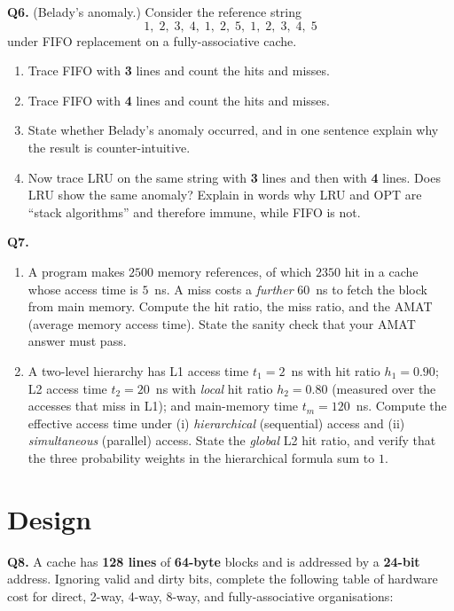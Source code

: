 \documentclass[11pt]{article}
\begin{document}
\textbf{Q6.} (Belady's anomaly.) Consider the reference string
\[
1,\;2,\;3,\;4,\;1,\;2,\;5,\;1,\;2,\;3,\;4,\;5
\]
under FIFO replacement on a fully-associative cache.
\begin{enumerate}
  \item[(a)] Trace FIFO with \textbf{3} lines and count the hits and misses.
  \item[(b)] Trace FIFO with \textbf{4} lines and count the hits and misses.
  \item[(c)] State whether Belady's anomaly occurred, and in one sentence explain why the result is counter-intuitive.
  \item[(d)] Now trace LRU on the same string with \textbf{3} lines and then with \textbf{4} lines. Does LRU show the same anomaly? Explain in words why LRU and OPT are ``stack algorithms'' and therefore immune, while FIFO is not.
\end{enumerate}

\textbf{Q7.}
\begin{enumerate}
  \item[(a)] A program makes $2500$ memory references, of which $2350$ hit in a cache whose access time is $5$~ns. A miss costs a \emph{further} $60$~ns to fetch the block from main memory. Compute the hit ratio, the miss ratio, and the AMAT (average memory access time). State the sanity check that your AMAT answer must pass.
  \item[(b)] A two-level hierarchy has L1 access time $t_1 = 2$~ns with hit ratio $h_1 = 0.90$; L2 access time $t_2 = 20$~ns with \emph{local} hit ratio $h_2 = 0.80$ (measured over the accesses that miss in L1); and main-memory time $t_m = 120$~ns. Compute the effective access time under (i) \emph{hierarchical} (sequential) access and (ii) \emph{simultaneous} (parallel) access. State the \emph{global} L2 hit ratio, and verify that the three probability weights in the hierarchical formula sum to $1$.
\end{enumerate}

\section{Design}

\textbf{Q8.} A cache has \textbf{128 lines} of \textbf{64-byte} blocks and is addressed by a \textbf{24-bit} address. Ignoring valid and dirty bits, complete the following table of hardware cost for direct, 2-way, 4-way, 8-way, and fully-associative organisations:
\end{document}
